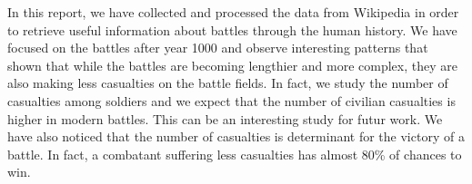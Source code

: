 In this report, we have collected and processed the data from Wikipedia in order to retrieve useful information about battles through the human history. We have focused on the battles after year 1000 and observe interesting patterns that shown that while the battles are becoming lengthier and more complex, they are also making less casualties on the battle fields. In fact, we study the number of casualties among soldiers and we expect that the number of civilian casualties is higher in modern battles. This can be an interesting study for futur work. We have also noticed that the number of casualties is determinant for the victory of a battle. In fact, a combatant suffering less casualties has almost 80\% of chances to win. 